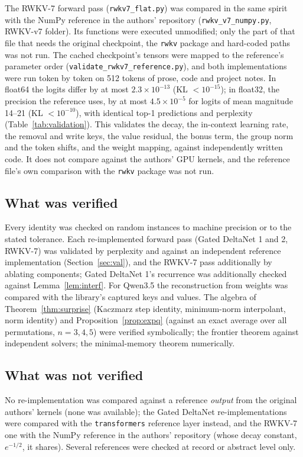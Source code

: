 The RWKV-7 forward pass (\texttt{rwkv7\_flat.py}) was compared in the same spirit with the NumPy reference in the authors' repository (\texttt{rwkv\_v7\_numpy.py}, RWKV-v7 folder). Its functions were executed unmodified; only the part of that file that needs the original checkpoint, the \texttt{rwkv} package and hard-coded paths was not run. The cached checkpoint's tensors were mapped to the reference's parameter order (\texttt{validate\_rwkv7\_reference.py}), and both implementations were run token by token on 512 tokens of prose, code and project notes. In float64 the logits differ by at most $2.3\times10^{-13}$ (KL $<10^{-15}$); in float32, the precision the reference uses, by at most $4.5\times10^{-5}$ for logits of mean magnitude 14--21 (KL $<10^{-10}$), with identical top-1 predictions and perplexity (Table~\ref{tab:validation}). This validates the decay, the in-context learning rate, the removal and write keys, the value residual, the bonus term, the group norm and the token shifts, and the weight mapping, against independently written code. It does not compare against the authors' GPU kernels, and the reference file's own comparison with the \texttt{rwkv} package was not run.

\subsection{What was verified}
Every identity was checked on random instances to machine precision or to the stated tolerance. Each re-implemented forward pass (Gated DeltaNet 1 and 2, RWKV-7) was validated by perplexity and against an independent reference implementation (Section~\ref{sec:val}), and the RWKV-7 pass additionally by ablating components; Gated DeltaNet 1's recurrence was additionally checked against Lemma~\ref{lem:interf}. For Qwen3.5 the reconstruction from weights was compared with the library's captured keys and values. The algebra of Theorem~\ref{thm:surprise} (Kaczmarz step identity, minimum-norm interpolant, norm identity) and Proposition~\ref{prop:expq} (against an exact average over all permutations, $n=3,4,5$) were verified symbolically; the frontier theorem against independent solvers; the minimal-memory theorem numerically.

\subsection{What was not verified}
No re-implementation was compared against a reference \emph{output} from the original authors' kernels (none was available); the Gated DeltaNet re-implementations were compared with the \texttt{transformers} reference layer instead, and the RWKV-7 one with the NumPy reference in the authors' repository (whose decay constant, $e^{-1/2}$, it shares). Several references were checked at record or abstract level only.

